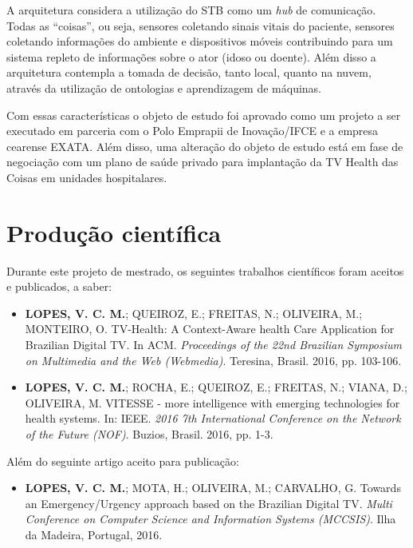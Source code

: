 A arquitetura considera a utilização do STB como um \textit{hub} de
comunicação. Todas as ``coisas'', ou seja, sensores coletando sinais vitais do
paciente, sensores coletando informações do ambiente e dispositivos móveis
contribuindo para um sistema repleto de informações sobre o ator (idoso
ou doente). Além disso a arquitetura contempla a tomada de decisão, tanto
local, quanto na nuvem, através da utilização de ontologias e aprendizagem de
máquinas.

Com essas características o objeto de estudo foi aprovado como um
projeto a ser executado em parceria com o Polo Emprapii de Inovação/IFCE e
a empresa cearense EXATA. Além disso, uma alteração do objeto de estudo
está em fase de negociação com um plano de saúde privado para implantação
da TV Health das Coisas em unidades hospitalares.

\section{Produção científica}\label{sec:producao}  

Durante este projeto de mestrado, os seguintes trabalhos científicos foram
aceitos e publicados, a saber:

\begin{itemize}
  \item \textbf{LOPES, V. C. M.}; QUEIROZ, E.; FREITAS, N.; OLIVEIRA, M.; MONTEIRO, O. TV-Health:
  A Context-Aware health Care Application for Brazilian Digital TV. In ACM.
  \textit{Proceedings of the 22nd Brazilian Symposium on Multimedia and the Web (Webmedia)}. 
  Teresina, Brasil. 2016, pp. 103-106.

  \item \textbf{LOPES, V. C. M.}; ROCHA, E.; QUEIROZ, E.; FREITAS, N.; VIANA, D.; OLIVEIRA, M. VITESSE 
  - more intelligence with emerging technologies for health systems. In: IEEE. 
  \textit{2016 7th International Conference on the Network of the Future (NOF)}. Buzios, Brasil. 2016, pp. 1-3.
\end{itemize}

Além do seguinte artigo aceito para publicação:

\begin{itemize}
  \item \textbf{LOPES, V. C. M.}; MOTA, H.; OLIVEIRA, M.; CARVALHO, G. Towards an Emergency/Urgency
    approach based on the Brazilian Digital TV. \textit{Multi Conference on Computer Science 
    and Information Systems (MCCSIS)}. Ilha da Madeira, Portugal, 2016.
\end{itemize}

